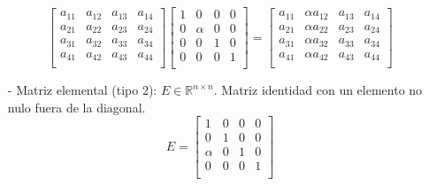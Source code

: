 \begin{itemize}
    \[
    \begin{bmatrix}
    a_{11} & a_{12} & a_{13} & a_{14} \\
    a_{21} & a_{22} & a_{23} & a_{24} \\
    a_{31} & a_{32} & a_{33} & a_{34} \\
    a_{41} & a_{42} & a_{43} & a_{44} \\
    \end{bmatrix}
    \begin{bmatrix}
    1 & 0 & 0 & 0 \\
    0 & \alpha & 0 & 0 \\
    0 & 0 & 1 & 0 \\
    0 & 0 & 0 & 1 \\
    \end{bmatrix}
    =
    \begin{bmatrix}
    a_{11} & \alpha a_{12} & a_{13} & a_{14} \\
    a_{21} & \alpha a_{22} & a_{23} & a_{24} \\
    a_{31} & \alpha a_{32} & a_{33} & a_{34} \\
    a_{41} & \alpha a_{42} & a_{43} & a_{44} \\
    \end{bmatrix}
    \]
        
    \item[-] Matriz elemental (tipo 2): $E \in \mathbb{R}^{n \times n}$. Matriz identidad con un elemento no nulo fuera de la diagonal.
    \[
    E = 
    \begin{bmatrix}
    1 & 0 & 0 & 0 \\
    0 & 1 & 0 & 0 \\
    \alpha & 0 & 1 & 0 \\
    0 & 0 & 0 & 1 \\
    \end{bmatrix}
    \]
    

\end{itemize}
